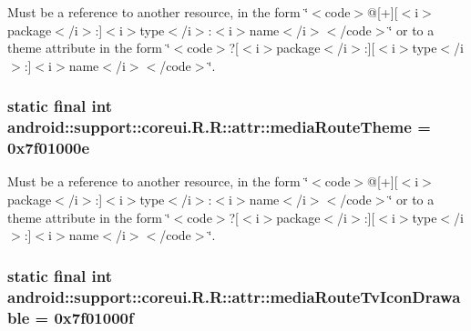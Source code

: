 Must be a reference to another resource, in the form \char`\"{}$<$code$>$@\mbox{[}+\mbox{]}\mbox{[}$<$i$>$package$<$/i$>$:\mbox{]}$<$i$>$type$<$/i$>$:$<$i$>$name$<$/i$>$$<$/code$>$\char`\"{} or to a theme attribute in the form \char`\"{}$<$code$>$?\mbox{[}$<$i$>$package$<$/i$>$:\mbox{]}\mbox{[}$<$i$>$type$<$/i$>$:\mbox{]}$<$i$>$name$<$/i$>$$<$/code$>$\char`\"{}. \hypertarget{classandroid_1_1support_1_1coreui_1_1_r_1_1attr_a9bb7610d4d33e841947577d6c642412}{
\subsubsection[{mediaRouteTheme}]{\setlength{\rightskip}{0pt plus 5cm}static final int android::support::coreui.R.R::attr::mediaRouteTheme = 0x7f01000e}}
\label{classandroid_1_1support_1_1coreui_1_1_r_1_1attr_a9bb7610d4d33e841947577d6c642412}


Must be a reference to another resource, in the form \char`\"{}$<$code$>$@\mbox{[}+\mbox{]}\mbox{[}$<$i$>$package$<$/i$>$:\mbox{]}$<$i$>$type$<$/i$>$:$<$i$>$name$<$/i$>$$<$/code$>$\char`\"{} or to a theme attribute in the form \char`\"{}$<$code$>$?\mbox{[}$<$i$>$package$<$/i$>$:\mbox{]}\mbox{[}$<$i$>$type$<$/i$>$:\mbox{]}$<$i$>$name$<$/i$>$$<$/code$>$\char`\"{}. \hypertarget{classandroid_1_1support_1_1coreui_1_1_r_1_1attr_37e449863557bf8379fdfec802726ee8}{
\subsubsection[{mediaRouteTvIconDrawable}]{\setlength{\rightskip}{0pt plus 5cm}static final int android::support::coreui.R.R::attr::mediaRouteTvIconDrawable = 0x7f01000f}}
\label{classandroid_1_1support_1_1coreui_1_1_r_1_1attr_37e449863557bf8379fdfec802726ee8}


